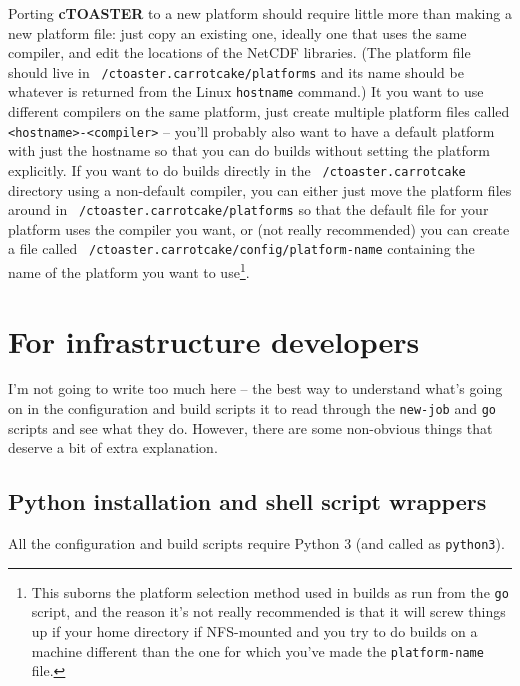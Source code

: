\documentclass[a4paper,10pt,article]{memoir}
\begin{document}
Porting \textbf{cTOASTER} to a new platform should require little more than making
a new platform file: just copy an existing one, ideally one that uses
the same compiler, and edit the locations of the NetCDF libraries.
(The platform file should live in \texttt{~/ctoaster.carrotcake/platforms} and its
name should be whatever is returned from the Linux \texttt{hostname}
command.)  It you want to use different compilers on the same
platform, just create multiple platform files called
\texttt{<hostname>-<compiler>} -- you'll probably also want to have a
default platform with just the hostname so that you can do builds
without setting the platform explicitly.  If you want to do builds
directly in the \texttt{~/ctoaster.carrotcake} directory using a non-default
compiler, you can either just move the platform files around in
\texttt{~/ctoaster.carrotcake/platforms} so that the default file for your platform
uses the compiler you want, or (not really recommended) you can create
a file called \texttt{~/ctoaster.carrotcake/config/platform-name} containing the
name of the platform you want to use\footnote{This suborns the
  platform selection method used in builds as run from the \texttt{go}
  script, and the reason it's not really recommended is that it will
  screw things up if your home directory if NFS-mounted and you try to
  do builds on a machine different than the one for which you've made
  the \texttt{platform-name} file.}.

\newpage

\chapter{For infrastructure developers}

I'm not going to write too much here -- the best way to understand
what's going on in the configuration and build scripts it to read
through the \texttt{new-job} and \texttt{go} scripts and see what they
do.  However, there are some non-obvious things that deserve a bit of
extra explanation.

\section{Python installation and shell script wrappers}

All the configuration and build scripts require Python 3 (and called as
\texttt{python3}).
\end{document}
